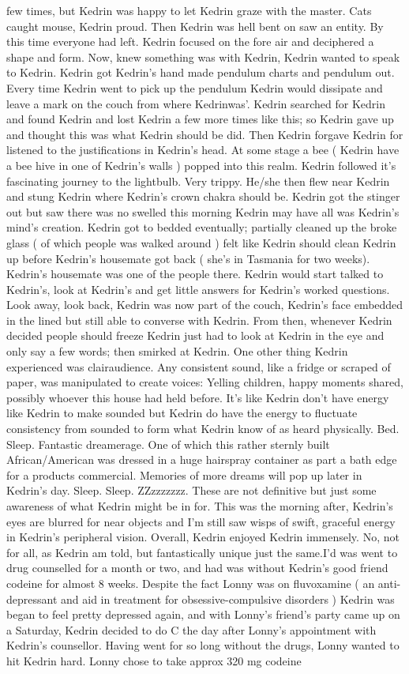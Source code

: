 \documentclass[12pt]{book}
\begin{document}
few times, but Kedrin was happy to let Kedrin graze with the master. Cats caught mouse, Kedrin proud. Then Kedrin was hell bent on saw an entity. By this time everyone had left. Kedrin focused on the fore air and deciphered a shape and form. Now, knew something was with Kedrin, Kedrin wanted to speak to Kedrin. Kedrin got Kedrin's hand made pendulum charts and pendulum out. Every time Kedrin went to pick up the pendulum Kedrin would dissipate and leave a mark on the couch from where Kedrinwas'. Kedrin searched for Kedrin and found Kedrin and lost Kedrin a few more times like this; so Kedrin gave up and thought this was what Kedrin should be did. Then Kedrin forgave Kedrin for listened to the justifications in Kedrin's head. At some stage a bee ( Kedrin have a bee hive in one of Kedrin's walls ) popped into this realm. Kedrin followed it's fascinating journey to the lightbulb. Very trippy. He/she then flew near Kedrin and stung Kedrin where Kedrin's crown chakra should be. Kedrin got the stinger out but saw there was no swelled this morning Kedrin may have all was Kedrin's mind's creation. Kedrin got to bedded eventually; partially cleaned up the broke glass ( of which people was walked around ) felt like Kedrin should clean Kedrin up before Kedrin's housemate got back ( she's in Tasmania for two weeks). Kedrin's housemate was one of the people there. Kedrin would start talked to Kedrin's, look at Kedrin's and get little answers for Kedrin's worked questions. Look away, look back, Kedrin was now part of the couch, Kedrin's face embedded in the lined but still able to converse with Kedrin. From then, whenever Kedrin decided people should freeze Kedrin just had to look at Kedrin in the eye and only say a few words; then smirked at Kedrin. One other thing Kedrin experienced was clairaudience. Any consistent sound, like a fridge or scraped of paper, was manipulated to create voices: Yelling children, happy moments shared, possibly whoever this house had held before. It's like Kedrin don't have energy like Kedrin to make sounded but Kedrin do have the energy to fluctuate consistency from sounded to form what Kedrin know of as heard physically. Bed. Sleep. Fantastic dreamerage. One of which this rather sternly built African/American was dressed in a huge hairspray container as part a bath edge for a products commercial. Memories of more dreams will pop up later in Kedrin's day. Sleep. Sleep. ZZzzzzzzz. These are not definitive but just some awareness of what Kedrin might be in for. This was the morning after, Kedrin's eyes are blurred for near objects and I'm still saw wisps of swift, graceful energy in Kedrin's peripheral vision. Overall, Kedrin enjoyed Kedrin immensely. No, not for all, as Kedrin am told, but fantastically unique just the same.I'd was went to drug counselled for a month or two, and had was without Kedrin's good friend codeine for almost 8 weeks. Despite the fact Lonny was on fluvoxamine ( an anti-depressant and aid in treatment for obsessive-compulsive disorders ) Kedrin was began to feel pretty depressed again, and with Lonny's friend's party came up on a Saturday, Kedrin decided to do C the day after Lonny's appointment with Kedrin's counsellor. Having went for so long without the drugs, Lonny wanted to hit Kedrin hard. Lonny chose to take approx 320 mg codeine 
\end{document}
